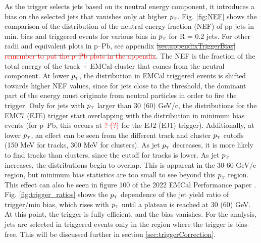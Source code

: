 \documentclass[ALICE]{ALICE_analysis_notes}
\newcommand{\pT}{$p_{\mbox{\tiny T}}$\xspace}
\newcommand{\pPb}{{\mbox{p--Pb}}\xspace}
\newcommand{\pp}{pp\xspace}
\providecommand{\DIFaddtex}[1]{{\protect\color{blue}\uwave{#1}}} %
\providecommand{\DIFdeltex}[1]{{\protect\color{red}\sout{#1}}}                      %
\providecommand{\DIFaddbegin}{} %
\providecommand{\DIFaddend}{} %
\providecommand{\DIFdelbegin}{} %
\providecommand{\DIFdelend}{} %
\providecommand{\DIFadd}[1]{\texorpdfstring{\DIFaddtex{#1}}{#1}} %
\providecommand{\DIFdel}[1]{\texorpdfstring{\DIFdeltex{#1}}{}} %
\newcommand{\DIFscaledelfig}{0.5}
\newlength{\DIFdelgraphicswidth} %
\newlength{\DIFdelgraphicsheight} %
\newcommand{\DIFaddincludegraphics}[2][]{{\color{blue}\fbox{\DIFOincludegraphics[#1]{#2}}}} %
\newcommand{\DIFdelincludegraphics}[2][]{%
\sbox{\DIFdelgraphicsbox}{\DIFOincludegraphics[#1]{#2}}%
\settoboxwidth{\DIFdelgraphicswidth}{\DIFdelgraphicsbox} %
\settoboxtotalheight{\DIFdelgraphicsheight}{\DIFdelgraphicsbox} %
\scalebox{\DIFscaledelfig}{%
\parbox[b]{\DIFdelgraphicswidth}{\usebox{\DIFdelgraphicsbox}\\[-\baselineskip] \rule{\DIFdelgraphicswidth}{0em}}\llap{\resizebox{\DIFdelgraphicswidth}{\DIFdelgraphicsheight}{%
\setlength{\unitlength}{\DIFdelgraphicswidth}%
\begin{picture}(1,1)%
\thicklines\linethickness{2pt} %
{\color[rgb]{1,0,0}\put(0,0){\framebox(1,1){}}}%
{\color[rgb]{1,0,0}\put(0,0){\line( 1,1){1}}}%
{\color[rgb]{1,0,0}\put(0,1){\line(1,-1){1}}}%
\end{picture}%
}\hspace*{3pt}}} %
} %
\DeclareRobustCommand{\DIFaddbegin}{\DIFOaddbegin \let\includegraphics\DIFaddincludegraphics} %
\DeclareRobustCommand{\DIFaddend}{\DIFOaddend \let\includegraphics\DIFOincludegraphics} %
\DeclareRobustCommand{\DIFdelbegin}{\DIFOdelbegin \let\includegraphics\DIFdelincludegraphics} %
\DeclareRobustCommand{\DIFdelend}{\DIFOaddend \let\includegraphics\DIFOincludegraphics} %
\begin{document}
As the trigger selects jets based on its neutral energy component, it introduces a bias on the selected jets that vanishes only at higher \pT. Fig. \ref{fig:NEF} shows the comparison of the distribution of the neutral energy fraction (NEF) of \pp jets in min. bias and triggered events for various bins in \pT for R = 0.2 jets. For other radii and equivalent plots in \pPb, see appendix \DIFdelbegin \DIFdel{\ref{sec:appendixTriggerBias} \textcolor{red}{remember to put the \pPb plots in the appendix}}\DIFdelend \DIFaddbegin \DIFadd{\ref{sec:appendixTriggerBiaspPb}}\DIFaddend . The NEF is the fraction of the total energy of the track + EMCal cluster that comes from the neutral component. At lower \pT, the distribution in EMCal triggered events is shifted towards higher NEF values, since for jets close to the threshold, the dominant part of the energy must originate from neutral particles in order to fire the trigger. Only for jets with \pT larger than 30 (60) GeV/c, the distributions for the EMC7 (EJE) trigger start overlapping with the distribution in minimum bias events (for \pPb, this occurs at \DIFdelbegin \DIFdel{\textcolor{red}{? (?)} }\DIFdelend \DIFaddbegin \DIFadd{30 (50) GeV }\DIFaddend for the EJ2 (EJ1) trigger). Additionally, at lower \pT, an effect can be seen from the different track and cluster \pT cutoffs (150 MeV for tracks, 300 MeV for clusters). As jet \pT decreases, it is more likely to find tracks than clusters, since the cutoff for tracks is lower. As jet \pT increases, the distributions begin to overlap. This is apparent in the 30-60 GeV/c region, but minimum bias statistics are too small to see beyond this \pT region. This effect can also be seen in figure 100 of the 2022 EMCal Performance paper \cite{EMCalPerformance}. Fig. \ref{fig:trigger_ratios} shows the \pT dependence of the jet yield ratio of trigger/min bias, which rises with \pT until a plateau is reached at 30 (60) GeV. At this point, the trigger is fully efficient, and the bias vanishes. For the analysis, jets are selected in triggered events only in the region where the trigger is bias-free. This will be discussed further in section \ref{sec:triggerCorrection}.
\end{document}

